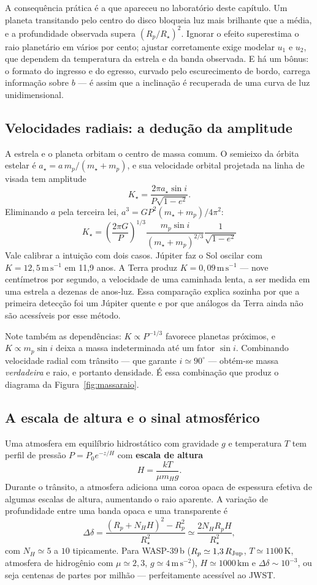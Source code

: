 \documentclass[11pt,a4paper]{article}
\begin{document}
A consequência prática é a que apareceu no laboratório deste capítulo. Um planeta transitando pelo centro do disco bloqueia luz mais brilhante que a média, e a profundidade observada supera $(R_p/R_\star)^{2}$. Ignorar o efeito superestima o raio planetário em vários por cento; ajustar corretamente exige modelar $u_1$ e $u_2$, que dependem da temperatura da estrela e da banda observada. E há um bônus: o formato do ingresso e do egresso, curvado pelo escurecimento de bordo, carrega informação sobre $b$ --- é assim que a inclinação é recuperada de uma curva de luz unidimensional.

\subsection*{Velocidades radiais: a dedução da amplitude}

A estrela e o planeta orbitam o centro de massa comum. O semieixo da órbita estelar é $a_\star=a\,m_p/(m_\star+m_p)$, e sua velocidade orbital projetada na linha de visada tem amplitude
\[
K_\star=\frac{2\pi a_\star\sin i}{P\sqrt{1-e^{2}}}.
\]
Eliminando $a$ pela terceira lei, $a^{3}=GP^{2}(m_\star+m_p)/4\pi^{2}$:
\[
\boxed{\ K_\star=\left(\frac{2\pi G}{P}\right)^{1/3}\frac{m_p\sin i}{(m_\star+m_p)^{2/3}}\frac{1}{\sqrt{1-e^{2}}}\ }
\]
Vale calibrar a intuição com dois casos. Júpiter faz o Sol oscilar com $K=12{,}5\,\mathrm{m\,s^{-1}}$ em 11,9 anos. A Terra produz $K=0{,}09\,\mathrm{m\,s^{-1}}$ --- nove centímetros por segundo, a velocidade de uma caminhada lenta, a ser medida em uma estrela a dezenas de anos-luz. Essa comparação explica sozinha por que a primeira detecção foi um Júpiter quente e por que análogos da Terra ainda não são acessíveis por esse método.

Note também as dependências: $K\propto P^{-1/3}$ favorece planetas próximos, e $K\propto m_p\sin i$ deixa a massa indeterminada até um fator $\sin i$. Combinando velocidade radial com trânsito --- que garante $i\simeq90^\circ$ --- obtém-se massa \emph{verdadeira} e raio, e portanto densidade. É essa combinação que produz o diagrama da Figura~\ref{fig:massaraio}.

\subsection*{A escala de altura e o sinal atmosférico}

Uma atmosfera em equilíbrio hidrostático com gravidade $g$ e temperatura $T$ tem perfil de pressão $P=P_0e^{-z/H}$ com \textbf{escala de altura}
\[
H=\frac{kT}{\mu m_Hg}.
\]
Durante o trânsito, a atmosfera adiciona uma coroa opaca de espessura efetiva de algumas escalas de altura, aumentando o raio aparente. A variação de profundidade entre uma banda opaca e uma transparente é
\[
\Delta\delta=\frac{(R_p+N_HH)^{2}-R_p^{2}}{R_\star^{2}}\simeq\frac{2N_HR_pH}{R_\star^{2}},
\]
com $N_H\simeq5$ a $10$ tipicamente. Para WASP-39\,b ($R_p\simeq1{,}3\,R_{\rm Jup}$, $T\simeq1100\,\mathrm{K}$, atmosfera de hidrogênio com $\mu\simeq2{,}3$, $g\simeq4\,\mathrm{m\,s^{-2}}$), $H\simeq1000\,\mathrm{km}$ e $\Delta\delta\sim10^{-3}$, ou seja centenas de partes por milhão --- perfeitamente acessível ao JWST.
\end{document}
